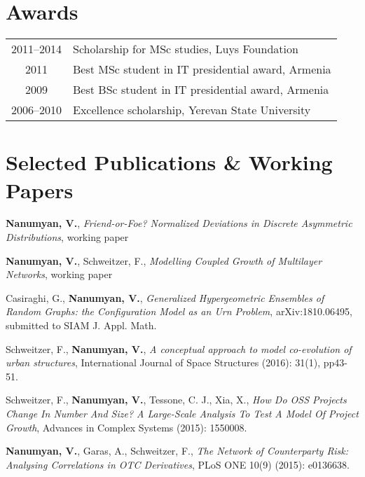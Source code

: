 \documentclass[]{vn-resume}
\begin{document}
\begin{minipage}[t]{0.66\textwidth}
    
    \section{Awards} 
    \begin{tabular}{@{}cl}
    2011--2014  &   Scholarship for MSc studies, Luys Foundation \\
    2011        &   Best MSc student in IT presidential award, Armenia \\
    2009        &   Best BSc student in IT presidential award, Armenia \\
    2006--2010  &   Excellence scholarship, Yerevan State University \\
    \end{tabular}
    \sectionsep
    
    
    \section{Selected Publications \& Working Papers} 
    \vspace{10pt}
    \begin{tightemize}
        \item {\bf Nanumyan, V.}, \emph{Friend-or-Foe? Normalized Deviations in Discrete Asymmetric Distributions}, working paper
        \item {\bf Nanumyan, V.}, Schweitzer, F.,  \emph{Modelling Coupled Growth of Multilayer Networks}, working paper
        \item Casiraghi, G., {\bf Nanumyan, V.},  \emph{Generalized Hypergeometric Ensembles of Random Graphs: the Configuration Model as an Urn Problem}, arXiv:1810.06495, submitted to SIAM J. Appl. Math.
        \item Schweitzer, F., {\bf Nanumyan, V.},\emph{  A conceptual approach to model co-evolution of urban structures}, International Journal of Space Structures (2016): 31(1), pp43-51.
        \item Schweitzer, F., {\bf Nanumyan, V.}, Tessone, C. J.,  Xia, X.,  \emph{How Do OSS Projects Change In Number And Size? A Large-Scale Analysis To Test A Model Of Project Growth}, Advances in Complex Systems (2015): 1550008.
        \item {\bf Nanumyan, V.}, Garas, A., Schweitzer, F.,  \emph{The Network of Counterparty Risk: Analysing Correlations in OTC Derivatives}, PLoS ONE 10(9) (2015): e0136638. 
    \end{tightemize}

\end{minipage} 
\end{document}
